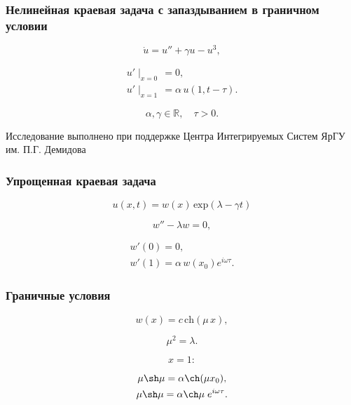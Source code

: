 \documentclass[fullscreen=true, unicode, bookmarks=false]{beamer}
\begin{document}
\begin{frame}
\frametitle{Нелинейная краевая задача с запаздыванием в граничном условии}
 
\begin{equation}\label{eq5}
	\dot{u}  = u'' + \gamma u - u^3,
\end{equation}	

\begin{gather}\label{eq6}	
	u'\mid_{x=0} \, = 0, \\
	u'\mid_{x=1} \, = \alpha\,u(1, t-\tau). \nonumber
\end{gather}

$$ \alpha,  \gamma \in \mathbb{R}, \quad \tau > 0. $$

\medskip

\begin{exampleblock}{}
{\large Исследование выполнено при поддержке Центра Интегрируемых Систем ЯрГУ им. П.Г. Демидова }
\end{exampleblock}

\end{frame}

\begin{frame}
\frametitle{ Упрощенная краевая задача }

$$ u(x, t) = w(x)\,\mbox{exp}\left( \lambda - \gamma t \right) $$

\bigskip
\pause
	
\begin{equation}\label{eq7}
	w'' - \lambda w = 0,
\end{equation}

\begin{gather}\label{eq8}	
	w'(0) = 0, \\
	w'(1) = \alpha\,w(x_0)e^{i \omega \tau}. \nonumber
\end{gather}

\end{frame}

\begin{frame}
\frametitle{ Граничные условия }

$$ w(x) = c \, \mbox{ch} (\mu\,x), $$

$$ \mu^2 = \lambda. $$

\vspace{1.1cm}
\pause
	
$$ x = 1: $$

\begin{gather}\label{eq9}	
	\mu \sh \mu = \alpha \ch(\mu x_0), \\
	\mu \sh \mu = \alpha \ch \mu \; e^{i \omega \tau}. \nonumber
\end{gather}

\end{frame}
\end{document}
